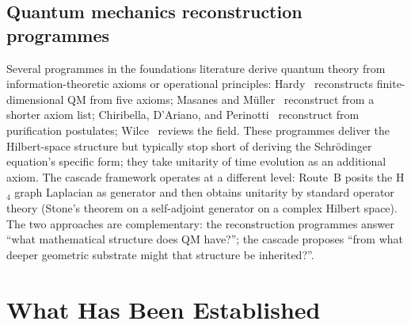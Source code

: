 \documentclass[12pt]{article}
\begin{document}
\subsection{Quantum mechanics reconstruction programmes}

Several programmes in the foundations literature derive quantum theory from information-theoretic axioms or operational principles: Hardy~\citep{Hardy2001} reconstructs finite-dimensional QM from five axioms; Masanes and M\"uller~\citep{MasanesMuller2011} reconstruct from a shorter axiom list; Chiribella, D'Ariano, and Perinotti~\citep{ChiribellaDArianoPerinotti2011} reconstruct from purification postulates; Wilce~\citep{Wilce2012} reviews the field. These programmes deliver the Hilbert-space structure but typically stop short of deriving the Schr\"odinger equation's specific form; they take unitarity of time evolution as an additional axiom. The cascade framework operates at a different level: Route~B posits the H${}_4$ graph Laplacian as generator and then obtains unitarity by standard operator theory (Stone's theorem on a self-adjoint generator on a complex Hilbert space). The two approaches are complementary: the reconstruction programmes answer ``what mathematical structure does QM have?''; the cascade proposes ``from what deeper geometric substrate might that structure be inherited?''.

\section{What Has Been Established}\label{sec:established}
\end{document}
